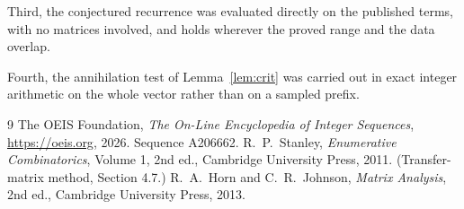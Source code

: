 \documentclass[11pt,a4paper]{article}
\theoremstyle{plain}
\theoremstyle{definition}
\begin{document}
Third, the conjectured recurrence was evaluated directly on the published terms, with no
matrices involved, and holds wherever the proved range and the data overlap.

Fourth, the annihilation test of Lemma~\ref{lem:crit} was carried out in exact integer
arithmetic on the whole vector rather than on a sampled prefix.

\begin{thebibliography}{9}
 The OEIS Foundation, \emph{The On-Line Encyclopedia of Integer
Sequences}, \url{https://oeis.org}, 2026. Sequence A206662.
 R.~P.~Stanley, \emph{Enumerative Combinatorics}, Volume 1, 2nd ed.,
Cambridge University Press, 2011. (Transfer-matrix method, Section 4.7.)
 R.~A.~Horn and C.~R.~Johnson, \emph{Matrix Analysis}, 2nd ed., Cambridge
University Press, 2013.
\end{thebibliography}
\end{document}
